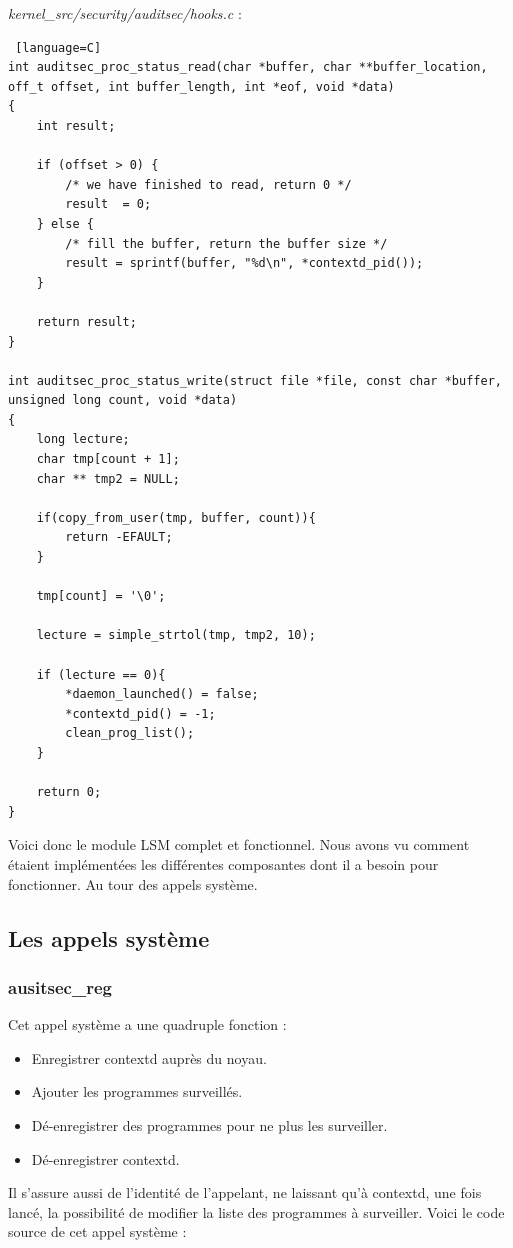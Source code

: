 \documentclass[pdftex,a4paper,titlepage,11pt]{article}
\begin{document}
\textit{{kernel\_src}/security/auditsec/hooks.c} :
\begin{lstlisting} [language=C]
int auditsec_proc_status_read(char *buffer, char **buffer_location,  off_t offset, int buffer_length, int *eof, void *data)
{
	int result;
	
	if (offset > 0) {
		/* we have finished to read, return 0 */
		result  = 0;
	} else {
		/* fill the buffer, return the buffer size */
		result = sprintf(buffer, "%d\n", *contextd_pid());
	}

	return result;
}

int auditsec_proc_status_write(struct file *file, const char *buffer, unsigned long count, void *data)
{
	long lecture;
	char tmp[count + 1];
	char ** tmp2 = NULL;

	if(copy_from_user(tmp, buffer, count)){ 
		return -EFAULT;
	}

	tmp[count] = '\0';

	lecture = simple_strtol(tmp, tmp2, 10);

	if (lecture == 0){
		*daemon_launched() = false;
		*contextd_pid() = -1;
		clean_prog_list();
	}

	return 0;
}
\end{lstlisting}

Voici donc le module LSM complet et fonctionnel. Nous avons vu comment étaient implémentées les différentes composantes dont il a besoin pour fonctionner. Au tour des appels système.

\subsection{Les appels système}

\subsubsection{ausitsec\_reg}

Cet appel système a une quadruple fonction :
\begin{itemize}
	\item Enregistrer contextd auprès du noyau.
	\item Ajouter les programmes surveillés.
	\item Dé-enregistrer des programmes pour ne plus les surveiller.
	\item Dé-enregistrer contextd.
\end{itemize}

Il s'assure aussi de l'identité de l'appelant, ne laissant qu'à contextd, une fois lancé, la possibilité de modifier la liste des programmes à surveiller. Voici le code source de cet appel système :
\end{document}
